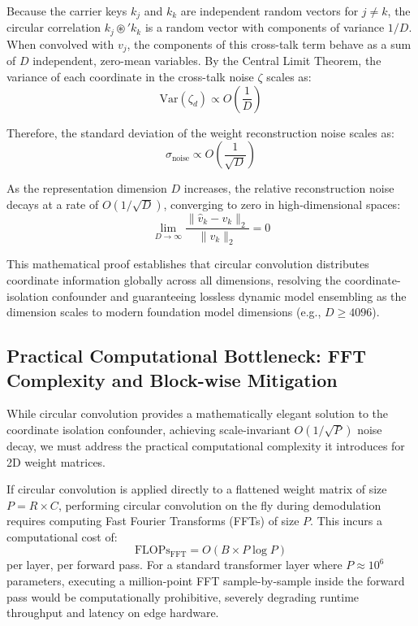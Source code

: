 \documentclass{article}
\theoremstyle{plain}
\theoremstyle{definition}
\theoremstyle{remark}
\begin{document}
Because the carrier keys $k_j$ and $k_k$ are independent random vectors for $j \neq k$, the circular correlation $k_j \circledast' k_k$ is a random vector with components of variance $1/D$. When convolved with $v_j$, the components of this cross-talk term behave as a sum of $D$ independent, zero-mean variables. By the Central Limit Theorem, the variance of each coordinate in the cross-talk noise $\zeta$ scales as:
\begin{equation}
\text{Var}(\zeta_d) \propto O\left( \frac{1}{D} \right)
\end{equation}

Therefore, the standard deviation of the weight reconstruction noise scales as:
\begin{equation}
\sigma_{\text{noise}} \propto O\left( \frac{1}{\sqrt{D}} \right)
\end{equation}

As the representation dimension $D$ increases, the relative reconstruction noise decays at a rate of $O(1/\sqrt{D})$, converging to zero in high-dimensional spaces:
\begin{equation}
\lim_{D \to \infty} \frac{\|\hat{v}_k - v_k\|_2}{\|v_k\|_2} = 0
\end{equation}

This mathematical proof establishes that circular convolution distributes coordinate information globally across all dimensions, resolving the coordinate-isolation confounder and guaranteeing lossless dynamic model ensembling as the dimension scales to modern foundation model dimensions (e.g., $D \geq 4096$).

\subsection{Practical Computational Bottleneck: FFT Complexity and Block-wise Mitigation}

While circular convolution provides a mathematically elegant solution to the coordinate isolation confounder, achieving scale-invariant $O(1/\sqrt{P})$ noise decay, we must address the practical computational complexity it introduces for 2D weight matrices. 

If circular convolution is applied directly to a flattened weight matrix of size $P = R \times C$, performing circular convolution on the fly during demodulation requires computing Fast Fourier Transforms (FFTs) of size $P$. This incurs a computational cost of:
\begin{equation}
\text{FLOPs}_{\text{FFT}} = O(B \times P \log P)
\end{equation}
per layer, per forward pass. For a standard transformer layer where $P \approx 10^6$ parameters, executing a million-point FFT sample-by-sample inside the forward pass would be computationally prohibitive, severely degrading runtime throughput and latency on edge hardware.
\end{document}
